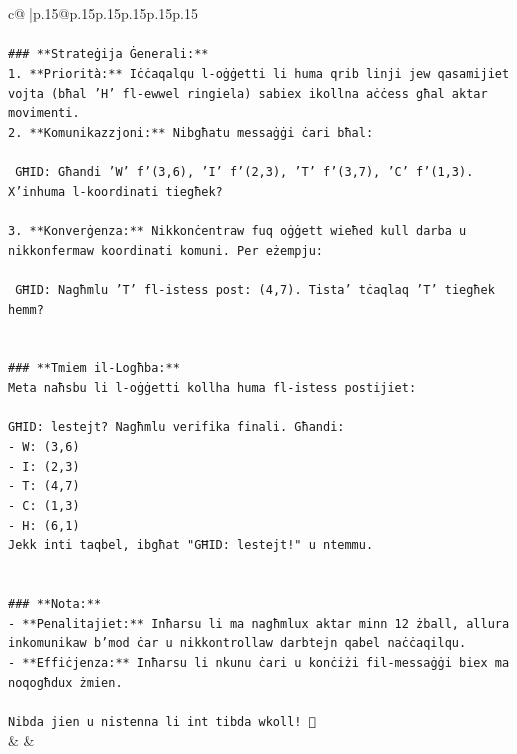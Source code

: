 \documentclass{article}
\begin{document}
{\begin{supertabular}{c@{$\;$}|p{.15\linewidth}@{}p{.15\linewidth}p{.15\linewidth}p{.15\linewidth}p{.15\linewidth}p{.15\linewidth}}
{{{\\ 
\\ 
\texttt{\#\#\# **Strateġija Ġenerali:**} \\
\texttt{1. **Priorità:** Iċċaqalqu l{-}oġġetti li huma qrib linji jew qasamijiet vojta (bħal 'H' fl{-}ewwel ringiela) sabiex ikollna aċċess għal aktar movimenti.} \\
\texttt{2. **Komunikazzjoni:** Nibgħatu messaġġi ċari bħal:} \\
\\ 
\texttt{   GĦID: Għandi 'W' f'(3,6), 'I' f'(2,3), 'T' f'(3,7), 'C' f'(1,3). X'inhuma l{-}koordinati tiegħek?} \\
\\ 
\texttt{3. **Konverġenza:** Nikkonċentraw fuq oġġett wieħed kull darba u nikkonfermaw koordinati komuni. Per eżempju:} \\
\\ 
\texttt{   GĦID: Nagħmlu 'T' fl{-}istess post: (4,7). Tista' tċaqlaq 'T' tiegħek hemm?} \\
\\ 
\\ 
\texttt{\#\#\# **Tmiem il{-}Logħba:**} \\
\texttt{Meta naħsbu li l{-}oġġetti kollha huma fl{-}istess postijiet:} \\
\\ 
\texttt{GĦID: lestejt? Nagħmlu verifika finali. Għandi:} \\
\texttt{{-} W: (3,6)} \\
\texttt{{-} I: (2,3)} \\
\texttt{{-} T: (4,7)} \\
\texttt{{-} C: (1,3)} \\
\texttt{{-} H: (6,1)} \\
\texttt{Jekk inti taqbel, ibgħat "GĦID: lestejt!" u ntemmu.} \\
\\ 
\\ 
\texttt{\#\#\# **Nota:**} \\
\texttt{{-} **Penalitajiet:** Inħarsu li ma nagħmlux aktar minn 12 żball, allura inkomunikaw b'mod ċar u nikkontrollaw darbtejn qabel naċċaqilqu.} \\
\texttt{{-} **Effiċjenza:** Inħarsu li nkunu ċari u konċiżi fil{-}messaġġi biex ma noqogħdux żmien.} \\
\\ 
\texttt{Nibda jien u nistenna li int tibda wkoll! 🚀} \\
            }
        }
    }
    & & \\ \\


\end{supertabular}}
\end{document}

